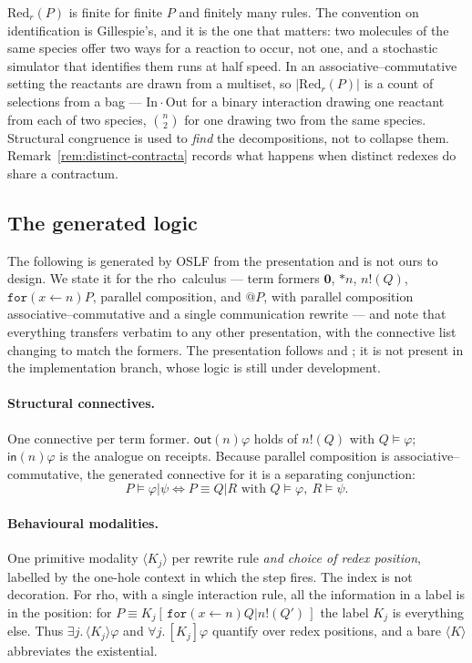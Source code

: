 \documentclass[11pt,a4paper]{article}
\theoremstyle{plain}
\theoremstyle{definition}
\theoremstyle{remark}
\newcommand{\rhoc}{\textsf{rho}}
\newcommand{\Nil}{\mathbf{0}}
\newcommand{\sepc}{\mathbin{\big|}}
\newcommand{\out}{\mathsf{out}}
\newcommand{\inn}{\mathsf{in}}
\newcommand{\Red}{\mathrm{Red}}
\begin{document}
$\Red_r(P)$ is finite for finite $P$ and finitely many rules. The convention on identification is
Gillespie's, and it is the one that matters: two molecules of the same species offer two ways for a
reaction to occur, not one, and a stochastic simulator that identifies them runs at half speed. In
an associative--commutative setting the reactants are drawn from a multiset, so $|\Red_r(P)|$ is a
count of selections from a bag --- $\mathrm{In}\cdot\mathrm{Out}$ for a binary interaction drawing
one reactant from each of two species, $\binom{n}{2}$ for one drawing two from the same species.
Structural congruence is used to \emph{find} the decompositions, not to collapse them.
Remark~\ref{rem:distinct-contracta} records what happens when distinct redexes do share a contractum.

\subsection{The generated logic}
\label{sec:logic}

The following is generated by OSLF from the presentation and is not ours to design. We state it for
the \rhoc\ calculus --- term formers $\Nil$, $*n$, $n!(Q)$, $\texttt{for}(x \leftarrow n)P$,
parallel composition, and $@P$, with parallel composition associative--commutative and a single
communication rewrite --- and note that everything transfers verbatim to any other presentation,
with the connective list changing to match the formers. The presentation follows
\cite[\S2]{classifier} and \cite[\S3]{scientist}; it is not present in the implementation branch,
whose logic is still under development.

\paragraph{Structural connectives.} One connective per term former. $\out(n)\varphi$ holds of
$n!(Q)$ with $Q \models \varphi$; $\inn(n)\varphi$ is the analogue on receipts. Because parallel
composition is associative--commutative, the generated connective for it is a separating
conjunction:
\[
P \models \varphi \sepc \psi
\iff
P \equiv Q \sepc R \text{ with } Q \models \varphi,\ R \models \psi .
\]

\paragraph{Behavioural modalities.} One primitive modality $\langle K_j \rangle$ per rewrite rule
\emph{and choice of redex position}, labelled by the one-hole context in which the step fires. The
index is not decoration. For \rhoc, with a single interaction rule, all the information in a label
is in the position: for $P \equiv K_j[\,\texttt{for}(x \leftarrow n)Q \sepc n!(Q')\,]$ the label
$K_j$ is everything else. Thus $\exists j.\,\langle K_j\rangle\varphi$ and
$\forall j.\,[K_j]\varphi$ quantify over redex positions, and a bare $\langle K \rangle$ abbreviates
the existential.
\end{document}

